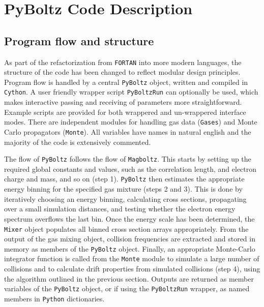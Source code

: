 \documentclass[3p,11pt]{elsarticle}
\begin{document}
\section{ PyBoltz Code Description}
\label{ PyBoltz }
\subsection{Program flow and structure}

As part of the refactorization from {\tt FORTAN} into more modern languages, the structure of the code has been changed to reflect modular design principles. Program flow is handled by a central {\tt PyBoltz} object, written and compiled in {\tt Cython}.  A user friendly wrapper script {\tt PyBoltzRun} can optionally be used, which makes interactive passing and receiving of parameters more straightforward.  Example scripts are provided for both wrappered and un-wrappered interface modes.  There are independent modules for handling gas data ({\tt Gases}) and Monte Carlo propagators ({\tt Monte}).  All variables have names in natural english and the majority of the code is extensively commented.

The flow of {\tt PyBoltz} follows the flow of {\tt Magboltz}. This starts by setting up the required global constants and values, such as the correlation length, and electron charge and mass, and so on (step 1). {\tt PyBoltz} then estimates the appropriate energy binning for the specified gas mixture (steps 2 and 3). This is done by iteratively choosing an energy binning, calculating cross sections, propagating over a small simulation distances, and testing whether the electron energy spectrum overflows the last bin.  Once the energy scale has been determined, the {\tt Mixer}  object populates all binned cross section arrays appropriately. From the output of the gas mixing object, collision frequencies are extracted and stored in memory as members of the {\tt PyBoltz} object. Finally, an appropriate Monte-Carlo integrator function is called from the {\tt Monte} module to simulate a large number of collisions and to calculate drift properties from simulated collisions (step 4), using the algorithm outlined in the previous section. Outputs are returned as member variables of the {\tt PyBoltz} object, or if using the {\tt PyBoltzRun} wrapper, as named members in {\tt Python} dictionaries.
\end{document}
